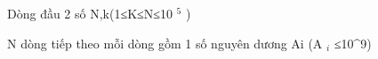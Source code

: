 Dòng đầu 2 số N,k(1≤K≤N≤10   $^    5   $   )  

   N dòng tiếp theo mỗi dòng gồm 1 số nguyên dương Ai (A   $_    i   $   ≤10^9)